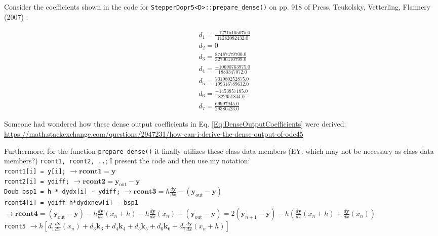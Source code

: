 \documentclass[10pt]{amsart}
\begin{document}
\begin{multicols*}{2}
Consider the coefficients shown in the code for \verb|StepperDopr5<D>::prepare_dense()| on pp. 918 of Press, Teukolsky, Vetterling, Flannery (2007) \cite{PTVF2007}:

\begin{equation}\label{Eq:DenseOutputCoefficients}
	\begin{aligned}
		& d_1 = \frac{-12715105075.0 }{ 11282082432.0 } \\
		& d_2 = 0 \\
		& d_3 = \frac{ 87487479700.0 }{ 32700410799.0 } \\
		& d_4 = \frac{ -10690763975.0 }{ 1880347072.0 } \\
		& d_5 = \frac{ 701980252875.0 }{ 199316789632.0 } \\
		& d_6 = \frac{-1453857185.0 }{ 822651844.0 } \\
		& d_7 = \frac{ 69997945.0 }{ 29380423.0 }
	\end{aligned}
\end{equation}

Someone had wondered how these dense output coefficients in Eq. \ref{Eq:DenseOutputCoefficients} were derived: \url{https://math.stackexchange.com/questions/2947231/how-can-i-derive-the-dense-output-of-ode45}

Furthermore, for the function \verb|prepare_dense()| it finally utilizes these class data members (EY: which may not be necessary as class data members?) \verb|rcont1, rcont2, ..|; I present the code and then use my notation: \\

\verb|rcont1[i] = y[i];| $\to \mathbf{rcont1} = \mathbf{y}$ \\
\verb|rcont2[i] = ydiff;| $\to \mathbf{rcont2} = \mathbf{y}_{\text{out}} - \mathbf{y}$ \\
\verb|Doub bsp1 = h * dydx[i] - ydiff;| $\to \mathbf{rcont3} = h \frac{d\mathbf{y}}{dx} - (\mathbf{y}_{\text{out}} - \mathbf{y})$ \\
\verb|rcont4[i] = ydiff-h*dydxnew[i] - bsp1| $\to \textbf{rcont4} = (\mathbf{y}_{\text{out}} - \mathbf{y}) - h \frac{d\mathbf{y}}{dx}(x_n + h) - h \frac{d\mathbf{y}}{dx}(x_n) + (\mathbf{y}_{\text{out}} - \mathbf{y}) = 2 ( \mathbf{y}_{n+1} - \mathbf{y}) - h \left( \frac{d\mathbf{y}}{dx}(x_n +h) + \frac{d\mathbf{y}}{dx} (x_n) \right)$ \\
\verb|rcont5| $\to h \left[ d_1 \frac{d\mathbf{y}}{dx} (x_n) + d_3 \mathbf{k}_3 + d_4 \mathbf{k}_4 + d_5 \mathbf{k}_5 + d_6 \mathbf{k}_6 + d_7 \frac{d\mathbf{y}}{dx}(x_n +h) \right]$



\end{multicols*}
\end{document}
